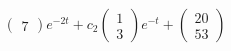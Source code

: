 \documentclass{article}
\begin{document}
\begin{align*}
\begin{pmatrix}
                            7
                          \end{pmatrix} e^{-2 t} + c_2 \begin{pmatrix}
                                                         1 \\
                                                         3
                                                       \end{pmatrix} e^{-t} + \begin{pmatrix}
                                                                                20 \\
                                                                                53
                                                                              \end{pmatrix}
\end{align*}

\setcounter{subsubsection}{38}
\subsubsection{}
\end{document}
